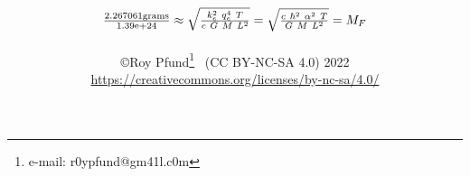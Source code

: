 
\usepackage{pst-node}%
\usepackage{tabu}
\usepackage{natbib}
\usepackage{graphicx}
\usepackage[colorlinks=true,linkcolor=black,anchorcolor=black,citecolor=black,filecolor=black,menucolor=black,runcolor=black,urlcolor=black]{hyperref}%
\title{${2.267061 \text{grams} \over \text{1.39e+24}} \approx \sqrt{k_e^2~q_e^4~T \over c~G~M~L^2}= \sqrt{c~ \hbar^2 ~\alpha^2 ~T\over G~M~L^2}=M_F$ }
\author{\copyright Roy Pfund\thanks{e-mail: r0ypfund@gm41l.c0m} ~(CC BY-NC-SA 4.0) 2022\\
\url{https://creativecommons.org/licenses/by-nc-sa/4.0/}}

